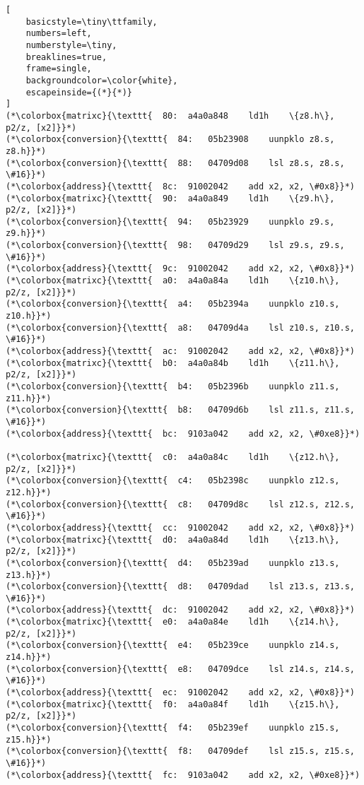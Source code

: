 \documentclass[a4paper,10pt]{article}
\begin{document}
\begin{lstlisting}[
    basicstyle=\tiny\ttfamily,
    numbers=left,
    numberstyle=\tiny,
    breaklines=true,
    frame=single,
    backgroundcolor=\color{white},
    escapeinside={(*}{*)}
]
(*\colorbox{matrixc}{\texttt{  80:	a4a0a848 	ld1h	\{z8.h\}, p2/z, [x2]}}*)
(*\colorbox{conversion}{\texttt{  84:	05b23908 	uunpklo	z8.s, z8.h}}*)
(*\colorbox{conversion}{\texttt{  88:	04709d08 	lsl	z8.s, z8.s, \#16}}*)
(*\colorbox{address}{\texttt{  8c:	91002042 	add	x2, x2, \#0x8}}*)
(*\colorbox{matrixc}{\texttt{  90:	a4a0a849 	ld1h	\{z9.h\}, p2/z, [x2]}}*)
(*\colorbox{conversion}{\texttt{  94:	05b23929 	uunpklo	z9.s, z9.h}}*)
(*\colorbox{conversion}{\texttt{  98:	04709d29 	lsl	z9.s, z9.s, \#16}}*)
(*\colorbox{address}{\texttt{  9c:	91002042 	add	x2, x2, \#0x8}}*)
(*\colorbox{matrixc}{\texttt{  a0:	a4a0a84a 	ld1h	\{z10.h\}, p2/z, [x2]}}*)
(*\colorbox{conversion}{\texttt{  a4:	05b2394a 	uunpklo	z10.s, z10.h}}*)
(*\colorbox{conversion}{\texttt{  a8:	04709d4a 	lsl	z10.s, z10.s, \#16}}*)
(*\colorbox{address}{\texttt{  ac:	91002042 	add	x2, x2, \#0x8}}*)
(*\colorbox{matrixc}{\texttt{  b0:	a4a0a84b 	ld1h	\{z11.h\}, p2/z, [x2]}}*)
(*\colorbox{conversion}{\texttt{  b4:	05b2396b 	uunpklo	z11.s, z11.h}}*)
(*\colorbox{conversion}{\texttt{  b8:	04709d6b 	lsl	z11.s, z11.s, \#16}}*)
(*\colorbox{address}{\texttt{  bc:	9103a042 	add	x2, x2, \#0xe8}}*)

(*\colorbox{matrixc}{\texttt{  c0:	a4a0a84c 	ld1h	\{z12.h\}, p2/z, [x2]}}*)
(*\colorbox{conversion}{\texttt{  c4:	05b2398c 	uunpklo	z12.s, z12.h}}*)
(*\colorbox{conversion}{\texttt{  c8:	04709d8c 	lsl	z12.s, z12.s, \#16}}*)
(*\colorbox{address}{\texttt{  cc:	91002042 	add	x2, x2, \#0x8}}*)
(*\colorbox{matrixc}{\texttt{  d0:	a4a0a84d 	ld1h	\{z13.h\}, p2/z, [x2]}}*)
(*\colorbox{conversion}{\texttt{  d4:	05b239ad 	uunpklo	z13.s, z13.h}}*)
(*\colorbox{conversion}{\texttt{  d8:	04709dad 	lsl	z13.s, z13.s, \#16}}*)
(*\colorbox{address}{\texttt{  dc:	91002042 	add	x2, x2, \#0x8}}*)
(*\colorbox{matrixc}{\texttt{  e0:	a4a0a84e 	ld1h	\{z14.h\}, p2/z, [x2]}}*)
(*\colorbox{conversion}{\texttt{  e4:	05b239ce 	uunpklo	z14.s, z14.h}}*)
(*\colorbox{conversion}{\texttt{  e8:	04709dce 	lsl	z14.s, z14.s, \#16}}*)
(*\colorbox{address}{\texttt{  ec:	91002042 	add	x2, x2, \#0x8}}*)
(*\colorbox{matrixc}{\texttt{  f0:	a4a0a84f 	ld1h	\{z15.h\}, p2/z, [x2]}}*)
(*\colorbox{conversion}{\texttt{  f4:	05b239ef 	uunpklo	z15.s, z15.h}}*)
(*\colorbox{conversion}{\texttt{  f8:	04709def 	lsl	z15.s, z15.s, \#16}}*)
(*\colorbox{address}{\texttt{  fc:	9103a042 	add	x2, x2, \#0xe8}}*)


\end{lstlisting}
\end{document}
